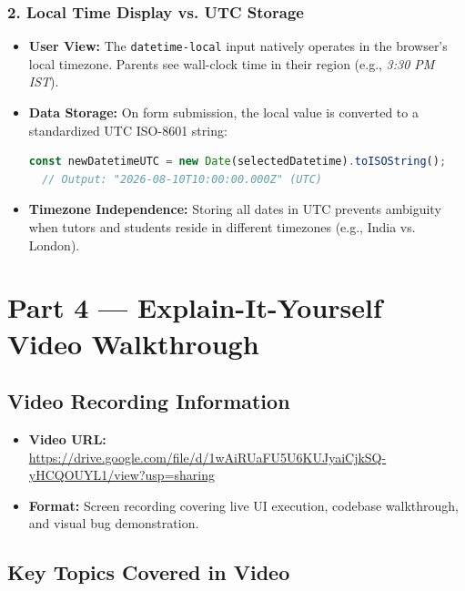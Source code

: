 \documentclass[11pt, a4paper]{article}
\begin{document}
\subsubsection{2. Local Time Display vs. UTC Storage}
\begin{itemize}
  \item \textbf{User View:} The \texttt{datetime-local} input natively operates in the browser's local timezone. Parents see wall-clock time in their region (e.g., \textit{3:30 PM IST}).
  \item \textbf{Data Storage:} On form submission, the local value is converted to a standardized UTC ISO-8601 string:
  \begin{lstlisting}[language=TypeScript]
  const newDatetimeUTC = new Date(selectedDatetime).toISOString();
  // Output: "2026-08-10T10:00:00.000Z" (UTC)
  \end{lstlisting}
  \item \textbf{Timezone Independence:} Storing all dates in UTC prevents ambiguity when tutors and students reside in different timezones (e.g., India vs. London).
\end{itemize}

\newpage

\section{Part 4 --- Explain-It-Yourself Video Walkthrough}

\subsection{Video Recording Information}

\begin{itemize}[leftmargin=*]
  \item \textbf{Video URL:} \url{https://drive.google.com/file/d/1wAiRUaFU5U6KUJyaiCjkSQ-yHCQOUYL1/view?usp=sharing}
  \item \textbf{Format:} Screen recording covering live UI execution, codebase walkthrough, and visual bug demonstration.
\end{itemize}

\subsection{Key Topics Covered in Video}
\end{document}
